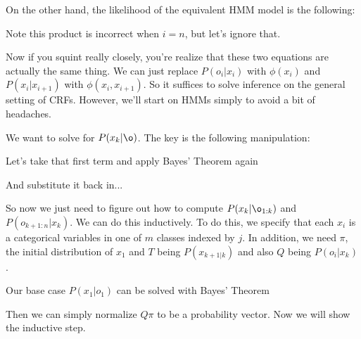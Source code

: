 \documentclass[12pt]{article}
\begin{document}

On the other hand, the likelihood of the equivalent HMM model is the following:

Note this product is incorrect when $i = n$, but let's ignore that.

Now if you squint really closely, you're realize that these two equations are actually the same thing. We can just replace $P(o_i|x_i)$ with $\phi(x_i)$ and $P(x_i|x_{i+1})$ with $\phi(x_i, x_{i+1})$. So it suffices to solve inference on the general setting of CRFs. However, we'll start on HMMs simply to avoid a bit of headaches.

We want to solve for $P(x_k|\o)$. The key is the following manipulation:


Let's take that first term and apply Bayes' Theorem again


And substitute it back in...


So now we just need to figure out how to compute $P(x_k|\o_{1:k})$ and $P(o_{k+1:n}|x_k)$. We can do this inductively. To do this, we specify that each $x_i$ is a categorical variables in one of $m$ classes indexed by $j$. In addition, we need $\pi$, the initial distribution of $x_1$ and $T$ being $P(x_{k+1|k})$ and also $Q$ being $P(o_i|x_k)$. 

Our base case $P(x_1|o_1)$ can be solved with Bayes' Theorem


Then we can simply normalize $Q\pi$ to be a probability vector. Now we will show the inductive step.
\end{document}
